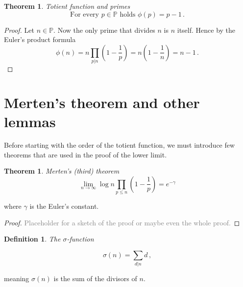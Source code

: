\documentclass{article}
\theoremstyle{definition}
\newtheorem{definition}[subsubsection]{Definition}
\newtheorem{theorem}[subsubsection]{Theorem}
\begin{document}
\begin{theorem}{\emph{Totient function and primes}}
\label{thm:phiprime}
\begin{equation*}
    \text{For every } p \in \mathbb{P} \text{ holds } \phi(p) = p-1\,.
\end{equation*}

\begin{proof}

Let $n\in\mathbb{P}$. Now the only prime that divides $n$ is $n$ itself. Hence by the Euler's product formula
\begin{equation*}
    \phi(n) = n \prod_{p \vert n} (1 - \frac{1}{p}) = n\left(1-\frac{1}{n}\right) = n-1\,.
\end{equation*}

\end{proof}

\end{theorem}

\section{Merten's theorem and other lemmas}

Before starting with the order of the totient function, we must introduce few theorems that are used in the proof of the lower limit.

\begin{theorem}{\emph{Merten's (third) theorem}}
\label{thm:mertens}
\begin{equation*}
    \lim_{n \rightarrow \infty} \log n \prod_{p\leq n} \left(1-\frac{1}{p}\right) = e^{-\gamma}
\end{equation*}

where $\gamma$ is the Euler's constant.

\begin{proof}

\textcolor{gray}{Placeholder for a sketch of the proof or maybe even the whole proof.}

\end{proof}

\end{theorem}

\begin{definition}{\emph{The $\sigma$-function}}

\begin{equation*}
    \sigma(n)=\sum_{d\vert n} d\,,
\end{equation*}

meaning $\sigma(n)$ is the sum of the divisors of $n$.
\end{definition}
\end{document}
